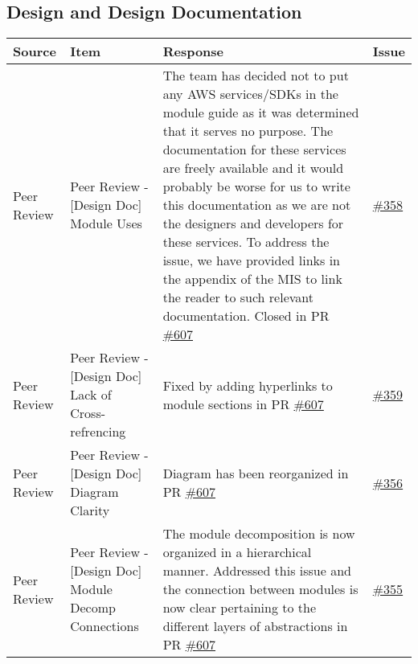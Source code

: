 \documentclass{article}
\begin{document}
\subsection{Design and Design Documentation}
\begin{longtable}{|m{3cm}|m{3cm}|m{5cm}|m{1cm}|}
\hline
\textbf{Source} & \textbf{Item} & \textbf{Response} & \textbf{Issue}\\
\hline
 Peer Review & Peer Review - [Design Doc] Module Uses & The team has decided not to put any AWS services/SDKs in the module guide
 as it was determined that it serves no purpose. The documentation for these services are freely available and it would probably
 be worse for us to write this documentation as we are not the designers and developers for these services. 
 To address the issue, we have provided links in the appendix of the MIS to link the reader to such relevant documentation.
 Closed in PR \href{https://github.com/Spitgranger/SyncMaster/pull/607}{\#607} & \href{https://github.com/Spitgranger/SyncMaster/pull/358}{\#358}\\
 \hline
 Peer Review & Peer Review - [Design Doc] Lack of Cross-refrencing & Fixed by adding hyperlinks to module sections in PR \href{https://github.com/Spitgranger/SyncMaster/pull/607}{\#607}
  & \href{https://github.com/Spitgranger/SyncMaster/pull/359}{\#359}\\
 \hline
 Peer Review & Peer Review - [Design Doc] Diagram Clarity & Diagram has been reorganized in PR \href{https://github.com/Spitgranger/SyncMaster/pull/607}{\#607} 
 & \href{https://github.com/Spitgranger/SyncMaster/pull/356}{\#356}\\
 \hline
 Peer Review & Peer Review - [Design Doc] Module Decomp Connections & The module decomposition is now organized in a hierarchical manner. 
 Addressed this issue and the connection between modules is now clear pertaining to the different layers of abstractions in PR \href{https://github.com/Spitgranger/SyncMaster/pull/607}{\#607} 
 & \href{https://github.com/Spitgranger/SyncMaster/pull/355}{\#355}\\
 \hline
\end{longtable}
\end{document}
